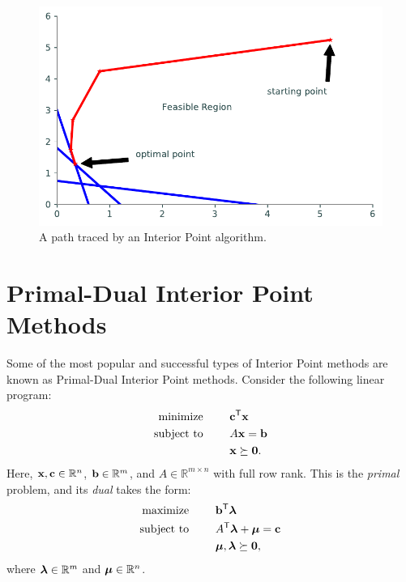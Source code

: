 \begin{figure}
\centering
\includegraphics[width=\textwidth]{figures/interiorPath.pdf}
\caption{A path traced by an Interior Point algorithm.}
\label{fig:intPath}
\end{figure}

\section*{Primal-Dual Interior Point Methods} %
Some of the most popular and successful types of Interior Point methods are known as Primal-Dual Interior Point methods.
Consider the following linear program:
\begin{align*}
\mbox{minimize }\qquad &\mathbf{c}^{\mathsf T} \mathbf{x}\\
\mbox{subject to }\qquad &A\mathbf{x} = \mathbf{b}\\
&\mathbf{x} \succeq \mathbf{0}.
\end{align*}
Here, $\mathbf{x}, \mathbf{c} \in \mathbb{R}^n$, $\mathbf{b} \in \mathbb{R}^m$, and $A\in\mathbb{R}^{m\times n}$ with full row rank.
This is the \emph{primal} problem, and its \emph{dual} takes the form:
\begin{align*}
\mbox{maximize }\qquad &\mathbf{b}^{\mathsf T} \boldsymbol{\lambda}\\
\mbox{subject to }\qquad &A^{\mathsf T} \boldsymbol{\lambda} + \boldsymbol{\mu} = \mathbf{c}\\
&\boldsymbol{\mu},\boldsymbol{\lambda} \succeq \mathbf{0},
\end{align*}
where $\boldsymbol{\lambda} \in \mathbb{R}^m$ and $\boldsymbol{\mu} \in \mathbb{R}^n$.


